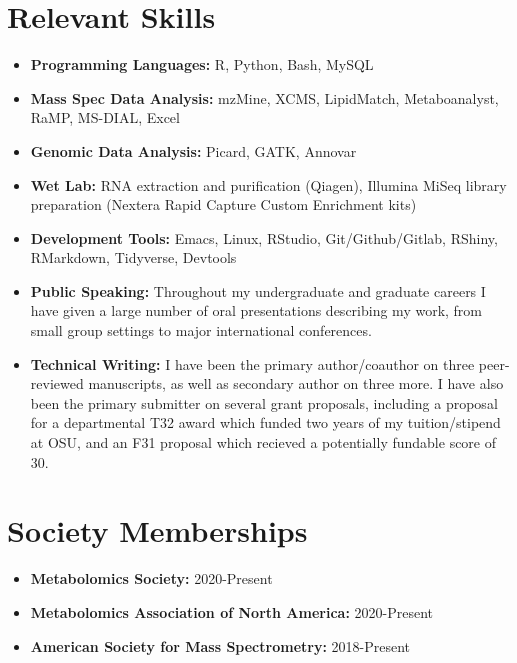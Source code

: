 \documentclass[11pt,a4paper,sans]{moderncv}        %
\begin{document}
\section{Relevant Skills}
\begin{itemize}
\item \textbf{Programming Languages:} R, Python, Bash, MySQL

\item \textbf{Mass Spec Data Analysis:} mzMine, XCMS, LipidMatch, Metaboanalyst, RaMP, MS-DIAL, Excel

\item \textbf{Genomic Data Analysis:} Picard, GATK, Annovar

\item \textbf{Wet Lab:} RNA extraction and purification (Qiagen),
  Illumina MiSeq library preparation (Nextera Rapid Capture Custom
  Enrichment kits)
  
\item \textbf{Development Tools:} Emacs, Linux, RStudio,
  Git/Github/Gitlab, RShiny, RMarkdown, Tidyverse, Devtools

\item \textbf{Public Speaking:} Throughout my undergraduate and
  graduate careers I have given a large number of oral presentations
  describing my work, from small group settings to major international
  conferences.

\item \textbf{Technical Writing:} I have been the primary
  author/coauthor on three peer-reviewed manuscripts, as well as
  secondary author on three more. I have also been the primary
  submitter on several grant proposals, including a proposal for a
  departmental T32 award which funded two years of my tuition/stipend
  at OSU, and an F31 proposal which recieved a potentially fundable
  score of 30.
  
\end{itemize}


\section{Society Memberships}

\begin{itemize}
  \item \textbf{Metabolomics Society:} 2020-Present
  \item \textbf{Metabolomics Association of North America:} 2020-Present
  \item \textbf{American Society for Mass Spectrometry:} 2018-Present
  \end{itemize}

\end{document}
